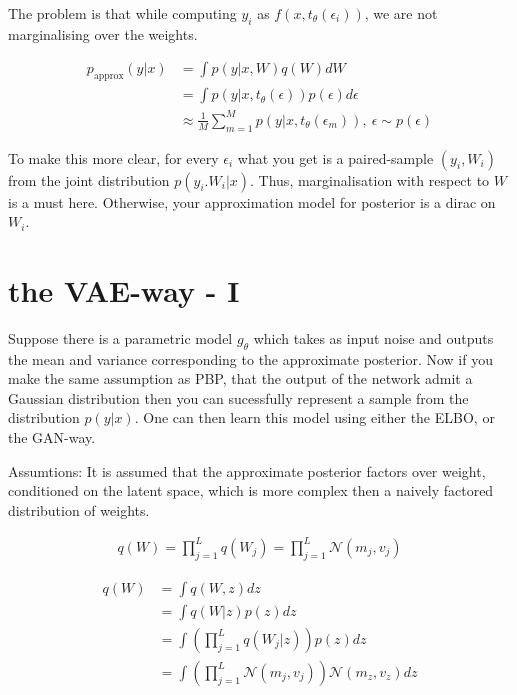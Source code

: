 \documentclass[twoside]{article}
\begin{document}
The problem is that while computing $y_i$ as $f(x,t_\theta(\epsilon_i))$, we are not marginalising over the weights. 

\begin{align}
p_{\text{approx}}(y|x) &= \int p(y|x,W)q(W) dW\\
& = \int p(y|x,t_\theta(\epsilon))p(\epsilon)d\epsilon\\
&\approx \frac{1}{M} \sum_{m=1}^{M} p(y|x,t_\theta(\epsilon_m)), \ \epsilon \sim p(\epsilon)
\end{align}

To make this more clear, for every $\epsilon_i$ what you get is a paired-sample $(y_i,W_i)$ from the joint distribution $p(y_i.W_i|x)$. Thus, marginalisation with respect to $W$ is a must here. Otherwise, your approximation model for posterior is a dirac on $W_i$.


\section{the VAE-way - I}

Suppose there is a parametric model $g_\theta$ which takes as input noise and outputs the mean and variance corresponding to the approximate posterior. Now if you make the same assumption as PBP, that the output of the network admit a Gaussian distribution then you can sucessfully represent a sample from the distribution $p(y|x)$. One can then learn this model using either the ELBO, or the GAN-way.

Assumtions: It is assumed that the approximate posterior factors over weight, conditioned on the latent space, which is more complex then a naively factored distribution of weights. 

\begin{align}
q(W) = \prod_{j=1}^Lq(W_j) = \prod_{j=1}^L \mathcal{N}(m_j,v_j)
\end{align}

\begin{align}
q(W) &= \int q(W,z)dz\\
&= \int q(W|z)p(z)dz\\
&= \int \left(\prod_{j=1}^Lq(W_j|z)\right)p(z)dz\\
&= \int \left(\prod_{j=1}^L\mathcal{N}(m_j,v_j)\right)\mathcal{N}(m_z,v_z)dz\\
\end{align}
\end{document}
